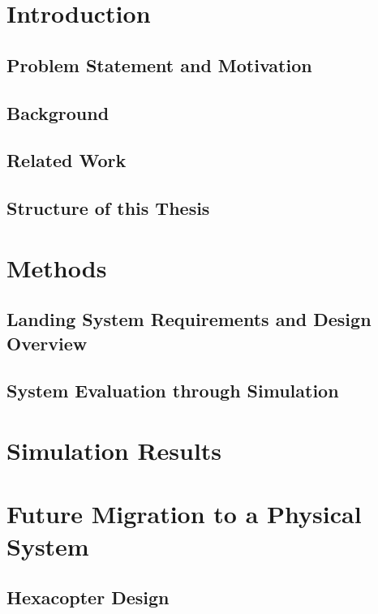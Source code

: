 \documentclass[11pt,letterpaper,oneside]{book}
\begin{document}
\chapter{Introduction}
\section{Problem Statement and Motivation}


\section{Background}


\section{Related Work}


\section{Structure of this Thesis}


\chapter{Methods}
\section{Landing System Requirements and Design Overview}


\section{System Evaluation through Simulation}


\chapter{Simulation Results}
\label{chapter:simulation_results}


\chapter{Future Migration to a Physical System}
\section{Hexacopter Design}

\end{document}
